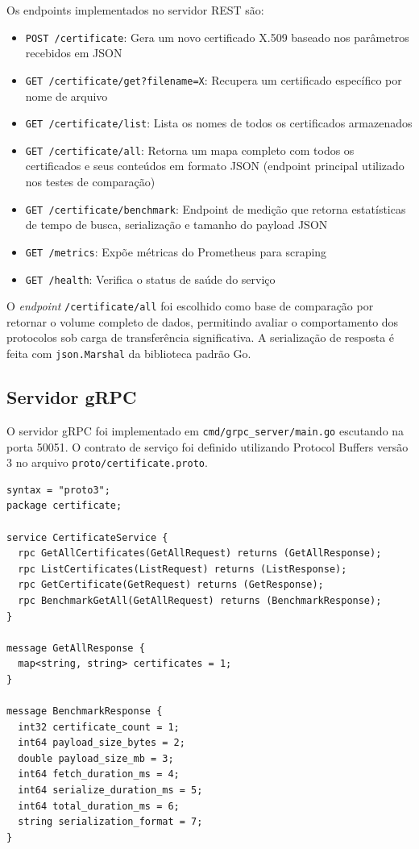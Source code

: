 Os endpoints implementados no servidor REST são:

\begin{itemize}
    \item \texttt{POST /certificate}: Gera um novo certificado X.509 baseado nos parâmetros recebidos em JSON
    \item \texttt{GET /certificate/get?filename=X}: Recupera um certificado específico por nome de arquivo
    \item \texttt{GET /certificate/list}: Lista os nomes de todos os certificados armazenados
    \item \texttt{GET /certificate/all}: Retorna um mapa completo com todos os certificados e seus conteúdos em formato JSON (endpoint principal utilizado nos testes de comparação)
    \item \texttt{GET /certificate/benchmark}: Endpoint de medição que retorna estatísticas de tempo de busca, serialização e tamanho do payload JSON
    \item \texttt{GET /metrics}: Expõe métricas do Prometheus para scraping
    \item \texttt{GET /health}: Verifica o status de saúde do serviço
\end{itemize}

O \textit{endpoint} \texttt{/certificate/all} foi escolhido como base de comparação por retornar o volume completo de dados, permitindo avaliar o comportamento dos protocolos sob carga de transferência significativa. A serialização de resposta é feita com \texttt{json.Marshal} da biblioteca padrão Go.

\subsection{Servidor gRPC}

O servidor gRPC foi implementado em \texttt{cmd/grpc\_server/main.go} escutando na porta 50051. O contrato de serviço foi definido utilizando Protocol Buffers versão 3 no arquivo \texttt{proto/certificate.proto}.

\begin{lstlisting}[caption={Definição do serviço em Protocol Buffers (certificate.proto)},label=lst:proto-def]
syntax = "proto3";
package certificate;

service CertificateService {
  rpc GetAllCertificates(GetAllRequest) returns (GetAllResponse);
  rpc ListCertificates(ListRequest) returns (ListResponse);
  rpc GetCertificate(GetRequest) returns (GetResponse);
  rpc BenchmarkGetAll(GetAllRequest) returns (BenchmarkResponse);
}

message GetAllResponse {
  map<string, string> certificates = 1;
}

message BenchmarkResponse {
  int32 certificate_count = 1;
  int64 payload_size_bytes = 2;
  double payload_size_mb = 3;
  int64 fetch_duration_ms = 4;
  int64 serialize_duration_ms = 5;
  int64 total_duration_ms = 6;
  string serialization_format = 7;
}
\end{lstlisting}

